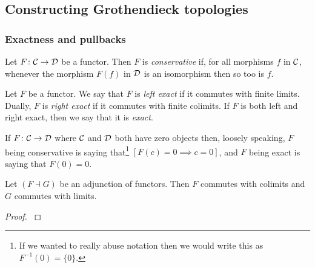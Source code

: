 
\subsection{Constructing Grothendieck topologies} %
\label{sub:constructing_grothendieck_topologies}

    \subsubsection{Exactness and pullbacks} %
    \label{ssub:exactness_and_pullbacks}

        \begin{definition}
            Let $F\colon\mathcal{C}\to\mathcal{D}$ be a functor.
            Then $F$ is \emph{conservative} if, for all morphisms $f$ in $\mathcal{C}$, whenever the morphism $F(f)$ in $\mathcal{D}$ is an isomorphism then so too is $f$.
        \end{definition}

        \begin{definition}
            Let $F$ be a functor.
            We say that $F$ is \emph{left exact} if it commutes with finite limits.
            Dually, $F$ is \emph{right exact} if it commutes with finite colimits.
            If $F$ is both left and right exact, then we say that it is \emph{exact}.
        \end{definition}

        If $F\colon\mathcal{C}\to\mathcal{D}$ where $\mathcal{C}$ and $\mathcal{D}$ both have zero objects then, loosely speaking, $F$ being conservative is saying that\footnote{
            If we wanted to really abuse notation then we would write this as $F^{-1}(0)=\{0\}$.
        } $[F(c)=0\implies c=0]$, and $F$ being exact is saying that $F(0)=0$.

        \begin{lemma}\label{le:adjoint-and-commuting-with-limits}
            Let $(F\dashv G)$ be an adjunction of functors.
            Then $F$ commutes with colimits and $G$ commutes with limits.
        \end{lemma}

        \begin{proof}
            \cite[\S V.5, p.118]{Lane:1998fe}
        \end{proof}

